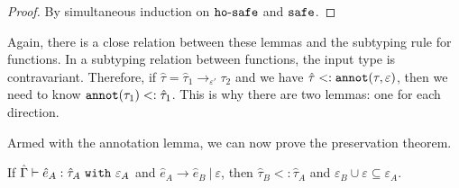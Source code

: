 \begin{proof}
By simultaneous induction on $\mathtt{ho \hbox{-} safe}$ and $\mathtt{safe}$.
\end{proof}

\noindent
Again, there is a close relation between these lemmas and the subtyping rule for functions. In a subtyping relation between functions, the input type is contravariant. Therefore, if $\hat \tau = \hat \tau_1 \rightarrow_{\varepsilon'} \tau_2$ and we have $\hat \tau <: \mathtt{annot}(\tau, \varepsilon)$, then we need to know $\mathtt{annot}(\tau_1) <: \hat \tau_1$. This is why there are two lemmas: one for each direction.

Armed with the annotation lemma, we can now prove the preservation theorem.

\begin{theorem}[Preservation]
If $\hat \Gamma \vdash \hat e_A: \hat \tau_A~\mathtt{with}~ \varepsilon_A$ and $\hat e_A \longrightarrow \hat e_B~|~\varepsilon$, then $\hat \tau_B <: \hat \tau_A$ and $\varepsilon_B \cup \varepsilon \subseteq \varepsilon_A$.
\end{theorem}

